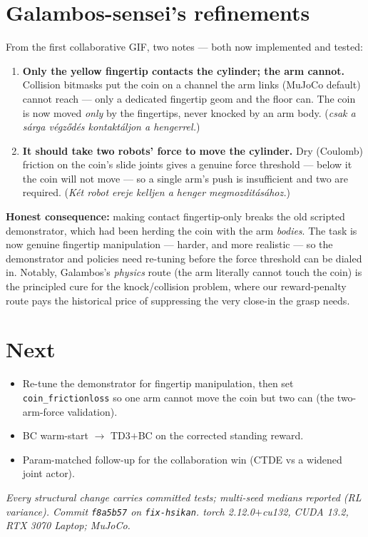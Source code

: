 \documentclass[11pt]{article}
\begin{document}
\section{Galambos-sensei's refinements}
From the first collaborative GIF, two notes --- both now implemented and tested:
\begin{enumerate}[topsep=2pt,itemsep=2pt]
  \item \textbf{Only the yellow fingertip contacts the cylinder; the arm cannot.} Collision bitmasks put the coin on a
  channel the arm links (MuJoCo default) cannot reach --- only a dedicated fingertip geom and the floor can. The coin is
  now moved \emph{only} by the fingertips, never knocked by an arm body. (\emph{csak a s\'arga v\'egz\H{o}d\'es
  kontakt\'aljon a hengerrel.})
  \item \textbf{It should take two robots' force to move the cylinder.} Dry (Coulomb) friction on the coin's slide joints
  gives a genuine force threshold --- below it the coin will not move --- so a single arm's push is insufficient and two are
  required. (\emph{K\'et robot ereje kelljen a henger megmozdit\'as\'ahoz.})
\end{enumerate}
\textbf{Honest consequence:} making contact fingertip-only breaks the old scripted demonstrator, which had been herding the
coin with the arm \emph{bodies}. The task is now genuine fingertip manipulation --- harder, and more realistic --- so the
demonstrator and policies need re-tuning before the force threshold can be dialed in. Notably, Galambos's \emph{physics}
route (the arm literally cannot touch the coin) is the principled cure for the knock/collision problem, where our
reward-penalty route pays the historical price of suppressing the very close-in the grasp needs.

\section{Next}
\begin{itemize}[topsep=2pt,itemsep=1pt]
  \item Re-tune the demonstrator for fingertip manipulation, then set \texttt{coin\_frictionloss} so one arm cannot move
  the coin but two can (the two-arm-force validation).
  \item BC warm-start $\to$ TD3$+$BC on the corrected standing reward.
  \item Param-matched follow-up for the collaboration win (CTDE vs a widened joint actor).
\end{itemize}

\vspace{4pt}\footnotesize\emph{Every structural change carries committed tests; multi-seed medians reported (RL variance).
Commit \texttt{f8a5b57} on \texttt{fix-hsikan}. torch 2.12.0$+$cu132, CUDA 13.2, RTX 3070 Laptop; MuJoCo.}
\end{document}

